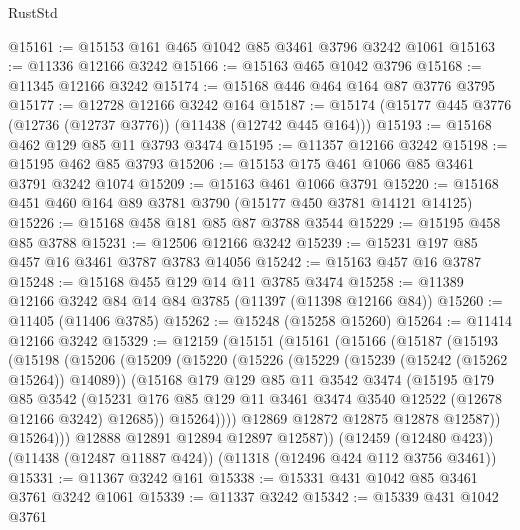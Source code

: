 \begin{lexlean}{RustStd}
\begin{coremodule}
@15161 := @15153 @161 @465 @1042 @85 @3461 @3796 @3242 @1061
@15163 := @11336 @12166 @3242
@15166 := @15163 @465 @1042 @3796
@15168 := @11345 @12166 @3242
@15174 := @15168 @446 @464 @164 @87 @3776 @3795
@15177 := @12728 @12166 @3242 @164
@15187 := @15174 (@15177 @445 @3776 (@12736 (@12737 @3776)) (@11438 (@12742 @445 @164)))
@15193 := @15168 @462 @129 @85 @11 @3793 @3474
@15195 := @11357 @12166 @3242
@15198 := @15195 @462 @85 @3793
@15206 := @15153 @175 @461 @1066 @85 @3461 @3791 @3242 @1074
@15209 := @15163 @461 @1066 @3791
@15220 := @15168 @451 @460 @164 @89 @3781 @3790 (@15177 @450 @3781 @14121 @14125)
@15226 := @15168 @458 @181 @85 @87 @3788 @3544
@15229 := @15195 @458 @85 @3788
@15231 := @12506 @12166 @3242
@15239 := @15231 @197 @85 @457 @16 @3461 @3787 @3783 @14056
@15242 := @15163 @457 @16 @3787
@15248 := @15168 @455 @129 @14 @11 @3785 @3474
@15258 := @11389 @12166 @3242 @84 @14 @84 @3785 (@11397 (@11398 @12166 @84))
@15260 := @11405 (@11406 @3785)
@15262 := @15248 (@15258 @15260)
@15264 := @11414 @12166 @3242
@15329 := @12159
    (@15151
      (@15161
        (@15166
          (@15187
            (@15193
              (@15198
                (@15206
                  (@15209
                    (@15220
                      (@15226
                        (@15229 (@15239 (@15242 (@15262 @15264)) @14089))
                        (@15168
                          @179
                          @129
                          @85
                          @11
                          @3542
                          @3474
                          (@15195
                            @179
                            @85
                            @3542
                            (@15231
                              @176
                              @85
                              @129
                              @11
                              @3461
                              @3474
                              @3540
                              @12522
                              (@12678 @12166 @3242)
                              @12685))
                          @15264))))
                  @12869
                  @12872
                  @12875
                  @12878
                  @12587))
              @15264)))
        @12888
        @12891
        @12894
        @12897
        @12587))
    (@12459 (@12480 @423))
    (@11438 (@12487 @11887 @424))
    (@11318 (@12496 @424 @112 @3756 @3461))
@15331 := @11367 @3242 @161
@15338 := @15331 @431 @1042 @85 @3461 @3761 @3242 @1061
@15339 := @11337 @3242
@15342 := @15339 @431 @1042 @3761

\end{coremodule}
\end{lexlean}
